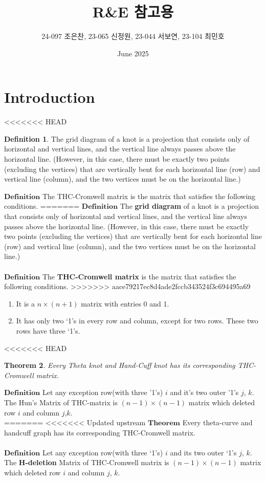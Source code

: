 \documentclass{article}
\title{R\&E 참고용}
\author{24-097 조은찬, 23-065 신정원, 23-044 서보연, 23-104 최민호}
\date{June 2025}
\newtheorem{thm}{Theorem}
\theoremstyle{definition}
\newtheorem{defn}[thm]{Definition}
\begin{document}
\maketitle

\section{Introduction}
<<<<<<< HEAD

\begin{defn}
The grid diagram of a knot is a projection that consists only of horizontal and vertical lines, and the vertical line always passes above the horizontal line. (However, in this case, there must be exactly two points (excluding the vertices) that are vertically bent for each horizontal line (row) and vertical line (column), and the two vertices must be on the horizontal line.)
\end{defn}

$\mathbf{Definition}$ The THC-Cromwell matrix is the matrix that satisfies the following conditions.
=======
$\mathbf{Definition}$ The \textbf{grid diagram} of a knot is a projection that consists only of horizontal and vertical lines, and the vertical line always passes above the horizontal line. (However, in this case, there must be exactly two points (excluding the vertices) that are vertically bent for each horizontal line (row) and vertical line (column), and the two vertices must be on the horizontal line.) \\ \\
$\mathbf{Definition}$ The \textbf{THC-Cromwell matrix} is the matrix that satisfies the following conditions.
>>>>>>> aace79217ec8d4ade2fccb343524f3c694495a69
\begin{enumerate}
    \item It is a $n\times(n+1)$ matrix with entries 0 and 1.
    \item It has only two `1's in every row and column, except for two rows. These two rows have three `1's.
\end{enumerate}
<<<<<<< HEAD

\begin{thm}
Every Theta knot and Hand-Cuff knot has its corresponding THC-Cromwell matrix.
\end{thm}
$\mathbf{Definition}$ Let any exception row(with three '1's) $i$ and it's two outer '1's $j$, $k$. The Hun's Matrix of THC-matrix is $(n-1)\times(n-1)$ matrix which deleted row $i$ and column $j$,$k$.\\
=======
<<<<<<< Updated upstream
$\mathbf{Theorem}$ Every theta-curve and handcuff graph has its corresponding THC-Cromwell matrix. \\ \\
$\mathbf{Definition}$ Let any exception row(with three `1's) $i$ and its two outer `1's $j$, $k$. The \textbf{H-deletion} Matrix of THC-Cromwell matrix is $(n-1)\times(n-1)$ matrix which deleted row $i$ and column $j$, $k$.\\ \\
\end{document}
